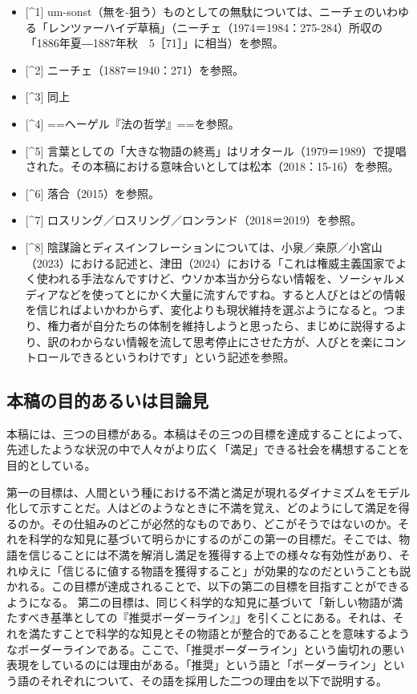 \begin{itemize}
\tightlist
\item
  {[}\^{}1{]}
  um-sonst（無を-狙う）ものとしての無駄については、ニーチェのいわゆる「レンツァーハイデ草稿」（ニーチェ（1974＝1984：275-284）所収の「1886年夏―1887年秋　5［71］」に相当）を参照。
\item
  {[}\^{}2{]} ニーチェ（1887＝1940：271）を参照。
\item
  {[}\^{}3{]} 同上
\item
  {[}\^{}4{]} ==ヘーゲル『法の哲学』==を参照。
\item
  {[}\^{}5{]}
  言葉としての「大きな物語の終焉」はリオタール（1979＝1989）で提唱された。その本稿における意味合いとしては松本（2018：15-16）を参照。
\item
  {[}\^{}6{]} 落合（2015）を参照。
\item
  {[}\^{}7{]} ロスリング／ロスリング／ロンランド（2018＝2019）を参照。
\item
  {[}\^{}8{]}
  陰謀論とディスインフレーションについては、小泉／桒原／小宮山（2023）における記述と、津田（2024）における「これは権威主義国家でよく使われる手法なんですけど、ウソか本当か分らない情報を、ソーシャルメディアなどを使ってとにかく大量に流すんですね。すると人びとはどの情報を信じればよいかわからず、変化よりも現状維持を選ぶようになると。つまり、権力者が自分たちの体制を維持しようと思ったら、まじめに説得するより、訳のわからない情報を流して思考停止にさせた方が、人びとを楽にコントロールできるというわけです」という記述を参照。
\end{itemize}

\subsection{本稿の目的あるいは目論見}\label{ux672cux7a3fux306eux76eeux7684ux3042ux308bux3044ux306fux76eeux8ad6ux898b}

本稿には、三つの目標がある。本稿はその三つの目標を達成することによって、先述したような状況の中で人々がより広く「満足」できる社会を構想することを目的としている。

第一の目標は、人間という種における不満と満足が現れるダイナミズムをモデル化して示すことだ。人はどのようなときに不満を覚え、どのようにして満足を得るのか。その仕組みのどこが必然的なものであり、どこがそうではないのか。それを科学的な知見に基づいて明らかにするのがこの第一の目標だ。そこでは、物語を信じることには不満を解消し満足を獲得する上での様々な有効性があり、それゆえに「信じるに値する物語を獲得すること」が効果的なのだということも説かれる。この目標が達成されることで、以下の第二の目標を目指すことができるようになる。
第二の目標は、同じく科学的な知見に基づいて「新しい物語が満たすべき基準としての『推奨ボーダーライン』」を引くことにある。それは、それを満たすことで科学的な知見とその物語とが整合的であることを意味するようなボーダーラインである。ここで、「推奨ボーダーライン」という歯切れの悪い表現をしているのには理由がある。「推奨」という語と「ボーダーライン」という語のそれぞれについて、その語を採用した二つの理由を以下で説明する。

